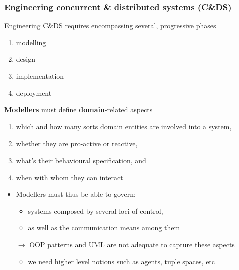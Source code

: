 \documentclass[handout]{beamer}\mode<presentation>{\usetheme{AMSCesenaPurpleAndGold}}
\begin{document}
\begin{frame}[allowframebreaks]
	\frametitle{Engineering concurrent \& distributed systems (C\&DS)}

	Engineering C\&DS requires encompassing several, progressive phases
	\begin{enumerate}
		\item modelling
		\item design
		\item implementation
		\item deployment
	\end{enumerate}

	\framebreak

	\begin{block}{\textbf{Modellers} must define \textbf{domain}-related aspects}
		\begin{enumerate}
			\item which and how many sorts \alert{domain entities} are involved into a system,
			\item whether they are \alert{pro-active} or \alert{reactive},
			\item what's their \alert{behavioural specification}, and
			\item when with whom they can \alert{interact}
		\end{enumerate}
	\end{block}

	\bigskip

	\begin{itemize}
		\item Modellers must thus be able to govern:
		\begin{itemize}
			\item systems composed by several \alert{loci of control},
			\item as well as the \alert{communication means} among them
		\end{itemize}

		\bigskip

		\item[$\rightarrow$] OOP patterns and UML are not adequate to capture these aspects
		\begin{itemize}
			\item we need higher level notions such as \alert{agents}, \alert{tuple spaces}, etc
		\end{itemize}
	\end{itemize}

	\framebreak


\end{frame}
\end{document}
